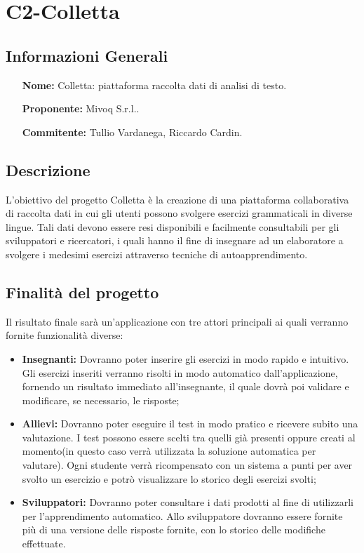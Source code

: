 \documentclass[a4paper, 11pt]{article}
\begin{document}
\section{C2-Colletta} 
\subsection{Informazioni Generali}
\begin{itemize}
	\item[\bf Nome:] Colletta: piattaforma raccolta dati di analisi di testo.
	\item[\bf Proponente:]Mivoq S.r.l..
	\item[\bf Commitente:]Tullio Vardanega, Riccardo Cardin.
\end{itemize}
\subsection{Descrizione}
L'obiettivo del progetto Colletta è la creazione di una piattaforma collaborativa  di raccolta dati in cui gli utenti possono svolgere esercizi grammaticali in diverse lingue. Tali dati devono essere resi disponibili e facilmente consultabili per gli sviluppatori e ricercatori, i quali hanno il fine di insegnare ad un elaboratore a svolgere i medesimi esercizi attraverso tecniche di autoapprendimento.
\subsection{Finalità del progetto}
Il risultato finale sarà un'applicazione con tre attori principali ai quali verranno fornite funzionalità diverse:
\begin{itemize}
\item \textbf{Insegnanti: }Dovranno poter inserire gli esercizi in modo rapido e intuitivo. Gli esercizi inseriti verranno risolti in modo automatico dall'applicazione, fornendo un risultato immediato all'insegnante, il quale dovrà poi validare e modificare, se necessario, le risposte;
\item \textbf{Allievi: }Dovranno poter eseguire il test in modo pratico e ricevere subito una valutazione. I test possono essere scelti tra quelli già presenti oppure creati al momento(in questo caso verrà utilizzata la soluzione automatica per valutare). Ogni studente verrà ricompensato con un sistema a punti per aver svolto un esercizio e potrò visualizzare lo storico degli esercizi svolti;
\item \textbf{Sviluppatori: }Dovranno poter consultare i dati prodotti al fine di utilizzarli per l'apprendimento automatico. Allo sviluppatore dovranno essere fornite più di una versione delle risposte fornite, con lo storico delle modifiche effettuate.
\end{itemize}
\end{document}
